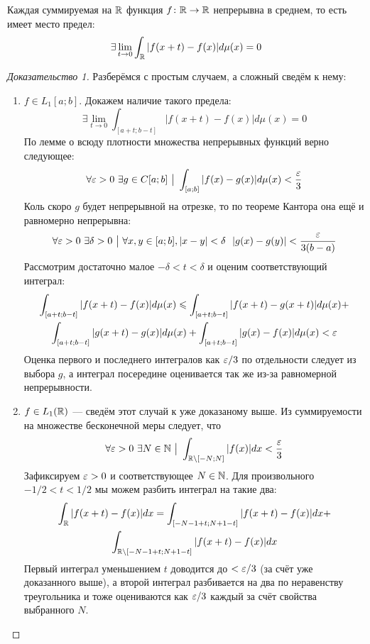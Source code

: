 \begin{lemma} \label{average_continuous}
	Каждая суммируемая на $\mathbb{R}$ функция $f \colon \mathbb{R} \to \mathbb{R}$ непрерывна в среднем, то есть имеет место предел:
	\[
		\exists \lim_{t \to 0} \int_{\mathbb{R}} |f(x + t) - f(x)|d\mu(x) = 0
	\]
\end{lemma}

\begin{proof}[Доказательство 1]
	Разберёмся с простым случаем, а сложный сведём к нему:
	\begin{enumerate}
		\item $f \in L_1[a; b]$. Докажем наличие такого предела:
		\[
			\exists \lim_{t \to 0} \int_{[a + t; b - t]} |f(x + t) - f(x)|d\mu(x) = 0
		\]
		По лемме о всюду плотности множества непрерывных функций верно следующее:
		\[
			\forall \varepsilon > 0\ \exists g \in C[a; b] \ \big|\  \int_{[a; b]} |f(x) - g(x)|d\mu(x) < \frac{\varepsilon}{3}
		\]
		Коль скоро $g$ будет непрерывной на отрезке, то по теореме Кантора она ещё и равномерно непрерывна:
		\[
			\forall \eps > 0\ \exists \delta > 0 \such \forall x, y \in [a; b], |x - y| < \delta\ \ |g(x) - g(y)| < \frac{\eps}{3(b - a)}
		\]
		Рассмотрим достаточно малое $-\delta < t < \delta$ и оценим соответствующий интеграл:
		\begin{multline*}
			\int_{[a + t; b - t]} |f(x + t) - f(x)|d\mu(x) \leqslant \int_{[a + t; b - t]} |f(x + t) - g(x + t)|d\mu(x) +
			\\
			\int_{[a + t; b - t]} |g(x + t) - g(x)|d\mu(x) + \int_{[a + t; b - t]} |g(x) - f(x)|d\mu(x) < \varepsilon
		\end{multline*}
		Оценка первого и последнего интегралов как $\varepsilon / 3$ по отдельности следует из выбора $g$, а интеграл посередине оценивается так же из-за равномерной непрерывности.
	
		\item $f \in L_1(\mathbb{R})$ --- сведём этот случай к уже доказаному выше. Из суммируемости на множестве бесконечной меры следует, что
		\[
			\forall \eps > 0\ \exists N \in \N \such \int_{\R \bs [-N; N]} |f(x)|dx < \frac{\eps}{3}
		\]
		Зафиксируем $\varepsilon > 0$ и соответствующее $N \in \mathbb{N}$. Для произвольного $-1/2 < t < 1/2$ мы можем разбить интеграл на такие два:
		\begin{multline*}
			\int_{\mathbb{R}} |f(x + t) - f(x)|dx = \int_{[-N - 1 + t; N + 1 - t]} |f(x + t) - f(x)|dx +
			\\
			\int_{\mathbb{R} \backslash [-N - 1 + t; N + 1 - t]} |f(x + t) - f(x)|dx
		\end{multline*}
		Первый интеграл уменьшением $t$ доводится до $< \varepsilon / 3$ (за счёт уже доказанного выше), а второй интеграл разбивается на два по неравенству треугольника и тоже оцениваются как $\varepsilon / 3$ каждый за счёт свойства выбранного $N$.
	\end{enumerate}
\end{proof}

